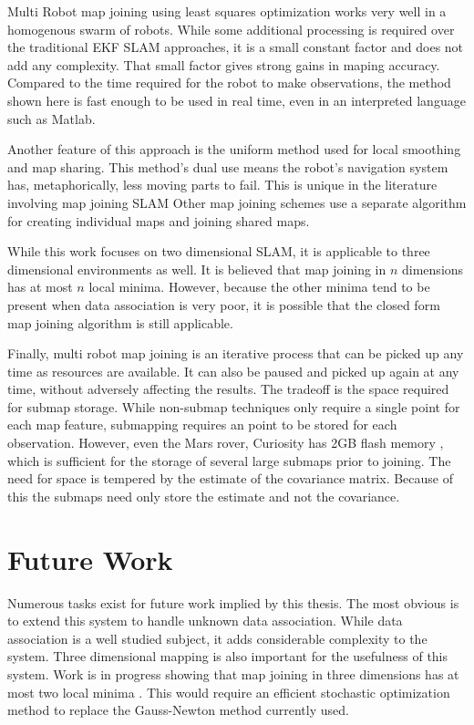 \documentclass[12pt]{report}
\begin{document}
Multi Robot map joining using least squares optimization works very
well in a homogenous swarm of robots. While some additional processing
is required over the traditional EKF SLAM approaches, it is a small
constant factor and does not add any complexity. That small factor
gives strong gains in maping accuracy. Compared to the time required
for the robot to make observations, the method shown here is fast
enough to be used in real time, even in an interpreted language such
as Matlab.
	
Another feature of this approach is the uniform method used for local
smoothing and map sharing. This method's dual use means the robot's
navigation system has, metaphorically, less moving parts to fail. This
is unique in the literature involving map joining SLAM \cite{slam}
Other map joining schemes use a separate algorithm for creating
individual maps and joining shared maps.

While this work focuses on two dimensional SLAM, it is applicable to
three dimensional environments as well.  It is believed
\cite{HuangICRA12} that map joining in $n$ dimensions has at most $n$
local minima.  However, because the other minima tend to be present
when data association is very poor, it is possible that the closed
form map joining algorithm is still applicable.
	
Finally, multi robot map joining is an iterative process that can be
picked up any time as resources are available. It can also be paused
and picked up again at any time, without adversely affecting the
results. The tradeoff is the space required for submap storage. While
non-submap techniques only require a single point for each map
feature, submapping requires an point to be stored for each
observation. However, even the Mars rover, Curiosity has 2GB flash
memory \cite{curiosity}, which is sufficient for the storage of
several large submaps prior to joining. The need for space is tempered
by the estimate of the covariance matrix. Because of this the submaps
need only store the estimate and not the covariance.
	

\chapter{Future Work}

Numerous tasks exist for future work implied by this thesis. The most
obvious is to extend this system to handle unknown data association.
While data association is a well studied subject, it adds considerable
complexity to the system. Three dimensional mapping is also important
for the usefulness of this system. Work is in progress showing that
map joining in three dimensions has at most two local minima
\cite{huang_icra12_talk}. This would require an efficient stochastic
optimization method to replace the Gauss-Newton method currently used.
\end{document}
